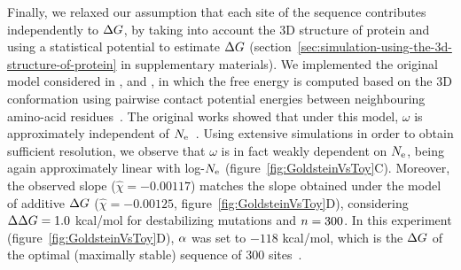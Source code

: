 Finally, we relaxed our assumption that each site of the sequence contributes independently to $\Delta G$, by taking into account the 3D structure of protein and using a statistical potential to estimate $\Delta G$ (section~\ref{sec:simulation-using-the-3d-structure-of-protein} in supplementary materials).
We implemented the original model considered in \citet{Williams2006}, \citet{Goldstein2011} and \citet{Pollock2012}, in which the free energy is computed based on the 3D conformation using pairwise contact potential energies between neighbouring amino-acid residues~\citep{Miyazawa1985}.
The original works showed that under this model, $\omega$ is approximately independent of $N_{\text{e}}$~\citep{Goldstein2013}.
Using extensive simulations in order to obtain sufficient resolution, we observe that $\omega$ is in fact weakly dependent on $N_{\text{e}}$, being again approximately linear with log-$N_{\text{e}}$ (figure~\ref{fig:GoldsteinVsToy}C).
Moreover, the observed slope ($\widehat{\chi}=-0.00117$) matches the slope obtained under the model of additive $\Delta G$ ($\widehat{\chi}=-0.00125$, figure~\ref{fig:GoldsteinVsToy}D), considering $\Delta \Delta G = 1.0$ kcal/mol for destabilizing mutations and $n=300$.
In this experiment (figure~\ref{fig:GoldsteinVsToy}D), $\alpha$ was set to $-118$ kcal/mol, which is the $\Delta G$ of the optimal (maximally stable) sequence of $300$ sites~\citep{Goldstein2011}.
